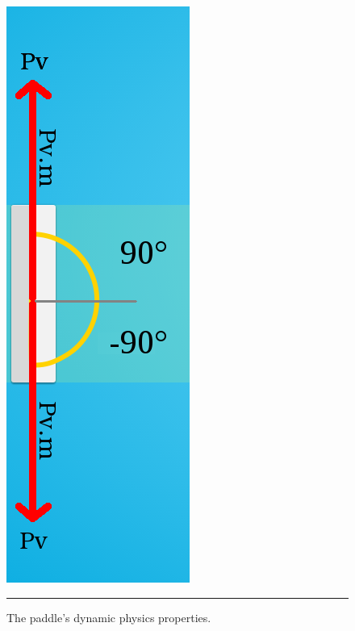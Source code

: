 \begin{figure}[htbp]
  \centering
  \includegraphics[scale=0.3]{../Figures/Chapter3/paddle.png}\\
  \rule{35em}{0.5pt}
  \caption[SimPL Paddle]{The paddle's dynamic physics properties.}
  \label{fig:paddle}
\end{figure}

